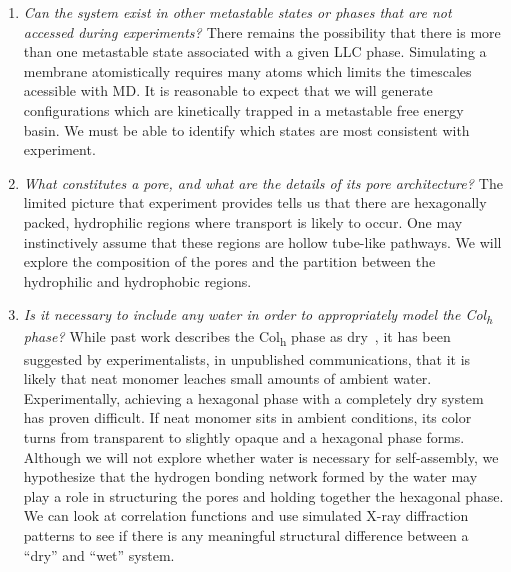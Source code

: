 \documentclass[journal=jpcbfk,manusciprt=article]{achemso}
\begin{document}
\begin{enumerate}
  \item \textit{Can the system exist in other metastable states or phases that are not
  accessed during experiments? \label{point:metastable}}
  There remains the possibility that there is more than one metastable state
  associated with a given LLC phase. Simulating a membrane atomistically
  requires many atoms which limits the timescales acessible with MD. It is
  reasonable to expect that we will generate configurations which are kinetically
  trapped in a metastable free energy basin. We must be able to identify which
  states 
  are most consistent with experiment.

  \item \textit{What constitutes a pore, and what are the details of its pore architecture? \label{point:poredefinition}}
  The limited picture that experiment provides tells us that there are
  hexagonally packed, hydrophilic regions where transport is likely to occur.
  One may instinctively assume that these regions are hollow tube-like pathways.
  We will explore the composition of the pores and the partition between the
  hydrophilic and hydrophobic regions. 

  \item \textit{Is it necessary to include any water in order to appropriately model
  the Col\textsubscript{h} phase? \label{point:water}}
  While past work describes the Col\textsubscript{h} phase as dry~\cite{feng_scalable_2014}, 
  it has been suggested by experimentalists, in
  unpublished communications, that it is likely that neat monomer leaches small
  amounts of ambient water. Experimentally, achieving a hexagonal phase with a
  completely dry system has proven difficult. If neat monomer sits in ambient
  conditions, its color turns from transparent to slightly opaque and a hexagonal
  phase forms. Although we will not explore whether water is necessary for
  self-assembly, we hypothesize that the hydrogen bonding network formed by the
  water may play a role in structuring the pores and holding together the
  hexagonal phase. We can look at correlation functions and use simulated X-ray
  diffraction patterns to see if there is any meaningful structural difference
  between a ``dry'' and ``wet'' system.

  \end{enumerate}
  
 
\end{document}
